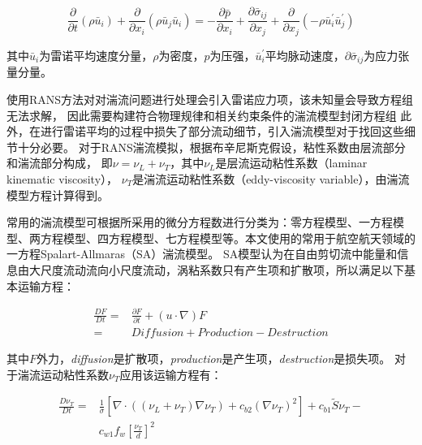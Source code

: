 \begin{equation}\frac{\partial}{\partial t}\left(\rho \bar{u}_{i}\right)+\frac{\partial}{\partial x_{i}}\left(\rho \bar{u}_{j} \bar{u}_{i}\right)=-\frac{\partial \bar{p}}{\partial x_{i}}+\frac{\partial \bar{\sigma}_{i j}}{\partial x_{j}}+\frac{\partial}{\partial x_{j}}\left(-\rho \bar{u}_{i}^{\prime} \bar{u}_{j}^{\prime}\right)\end{equation}

\noindent 其中$\bar{u}_{i}$为雷诺平均速度分量，$\rho$为密度，$p$为压强，$\bar{u}_{i}^{\prime}$平均脉动速度，$\partial \bar{\sigma}_{i j}$为应力张量分量。


使用RANS方法对对湍流问题进行处理会引入雷诺应力项，该未知量会导致方程组无法求解，
因此需要构建符合物理规律和相关约束条件的湍流模型封闭方程组
此外，在进行雷诺平均的过程中损失了部分流动细节，引入湍流模型对于找回这些细节十分必要。
对于RANS湍流模拟，根据布辛尼斯克\cite{schmitt2007boussinesq}假设，粘性系数由层流部分和湍流部分构成，
即$\nu=\nu_{L}+\nu_{T}$，其中$\nu_{L}$是层流运动粘性系数（laminar kinematic viscosity）， $\nu_{T}$是湍流运动粘性系数（eddy-viscosity variable），由湍流模型方程计算得到。

常用的湍流模型可根据所采用的微分方程数进行分类为：零方程模型、一方程模型、两方程模型、四方程模型、七方程模型等\cite{1998A}。本文使用的常用于航空航天领域的一方程Spalart-Allmaras（SA）湍流模型\cite{SAequation}。
SA模型认为在自由剪切流中能量和信息由大尺度流动流向小尺度流动，涡粘系数只有产生项和扩散项，所以满足以下基本运输方程：

\begin{equation}
\begin{split}
\frac{D F}{D t}= & \frac{\partial F}{\partial t}+(u \cdot \nabla) F \\ = & {Diffusion} + {Production} - {Destruction}
\end{split}
\end{equation}

\noindent 其中$F$外力，\textit{diffusion}是扩散项，\textit{production}是产生项，\textit{destruction}是损失项。
对于湍流运动粘性系数$\nu_{T}$应用该运输方程有：

\begin{equation}\label{SA_equo}
\begin{split}
\frac{D \nu_{T}}{D t}=& \frac{1}{\sigma}\left[\nabla \cdot((\nu_{L}+\nu_{T}) \nabla \nu_{T})+c_{b 2}(\nabla \nu_{T})^{2}\right] +c_{b 1} \tilde{S} \nu_{T} - \\ &c_{w 1} f_{w}\left[\frac{\nu_{T}}{d}\right]^{2}
\end{split}
\end{equation}

